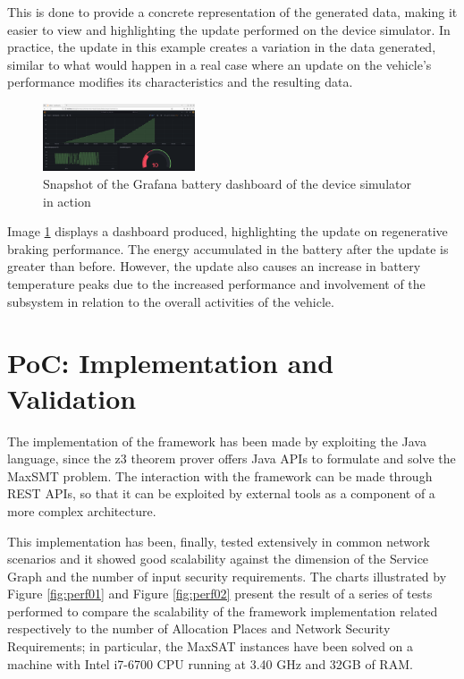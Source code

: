 \documentclass[10pt,a4paper,roman, twocolumn]{article}
\begin{document}
This is done to provide a concrete representation of the generated data, making it easier to view and highlighting the update performed on the device simulator. In practice, the update in this example creates a variation in the data generated, similar to what would happen in a real case where an update on the vehicle's performance modifies its characteristics and the resulting data.
\begin{figure} [tbh]
	\centerline{\includegraphics[width=0.4\textwidth]{images/grafana_Battery.png}}
	\caption{Snapshot of the Grafana battery dashboard of the device simulator in action}
	\label{fig:GrafanaBattery}
\end{figure}

Image \ref{fig:GrafanaBattery} displays a dashboard produced, highlighting the update on regenerative braking performance. The energy accumulated in the battery after the update is greater than before. However, the update also causes an increase in battery temperature peaks due to the increased performance and involvement of the subsystem in relation to the overall activities of the vehicle.

\section{PoC: Implementation and Validation}

The implementation of the framework has been made by exploiting the Java language, since the z3 theorem prover offers Java APIs to formulate and solve the MaxSMT problem. The interaction with the framework can be made through REST APIs, so that it can be exploited by external tools as a component of a more complex architecture.

This implementation has been, finally, tested extensively in common network scenarios and it showed good scalability against the dimension of the Service Graph and the number of input security requirements. The charts illustrated by Figure \ref{fig:perf01} and Figure \ref{fig:perf02} present the result of a series of tests performed to compare the scalability of the framework implementation related respectively to the number of Allocation Places and Network Security Requirements; in particular, the MaxSAT instances have been solved on a machine with Intel i7-6700 CPU running at 3.40 GHz and
32GB of RAM. 
\end{document}
